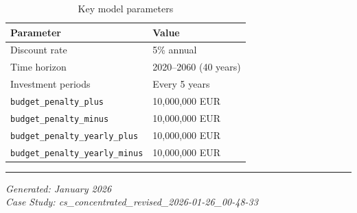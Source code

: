 \documentclass[11pt,a4paper]{article}
\begin{document}
\begin{table}[h]
\centering
\begin{tabular}{ll}
\toprule
\textbf{Parameter} & \textbf{Value} \\
\midrule
Discount rate & 5\% annual \\
Time horizon & 2020--2060 (40 years) \\
Investment periods & Every 5 years \\
\texttt{budget\_penalty\_plus} & 10,000,000 EUR \\
\texttt{budget\_penalty\_minus} & 10,000,000 EUR \\
\texttt{budget\_penalty\_yearly\_plus} & 10,000,000 EUR \\
\texttt{budget\_penalty\_yearly\_minus} & 10,000,000 EUR \\
\bottomrule
\end{tabular}
\caption{Key model parameters}
\end{table}

\vspace{1cm}
\noindent\rule{\textwidth}{0.4pt}

\noindent\textit{Generated: January 2026}\\
\noindent\textit{Case Study: cs\_concentrated\_revised\_2026-01-26\_00-48-33}
\end{document}
